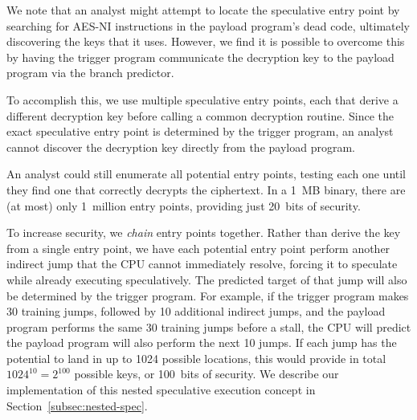 We note that an analyst might attempt to locate the speculative entry point by
searching for AES-NI instructions in the payload program's dead code, ultimately
discovering the keys that it uses. However, we find it is possible to overcome
this by having the trigger program communicate the decryption key to the payload
program via the branch predictor.

To accomplish this, we use multiple speculative entry points, each that derive a
different decryption key before calling a common decryption routine. Since
the exact speculative entry point is determined by the trigger program, an
analyst cannot discover the decryption key directly from the payload program.

An analyst could still enumerate all potential entry points, testing each one
until they find one that correctly decrypts the ciphertext. In a 1~MB binary,
there are (at most) only 1~million entry points, providing just 20~bits of
security.

To increase security, we \emph{chain} entry points together. Rather than derive
the key from a single entry point, we have each potential entry point perform
another indirect jump that the CPU cannot immediately resolve, forcing it to
speculate while already executing speculatively. The predicted target of that jump
will also be determined by the trigger program. For example, if the trigger
program makes 30 training jumps, followed by 10 additional indirect jumps, and
the payload program performs the same 30 training jumps before a stall, the CPU
will predict the payload program will also perform the next 10 jumps. If each
jump has the potential to land in up to 1024 possible locations, this would
provide in total $1024^{10} = 2^{100}$ possible keys, or 100~bits of security.
We describe our implementation of this nested speculative execution concept in
Section~\ref{subsec:nested-spec}.


